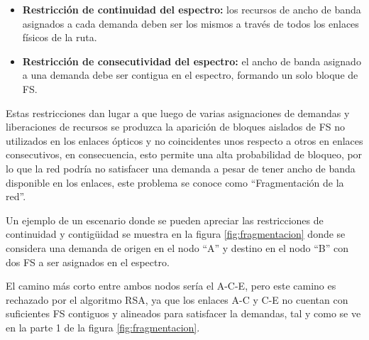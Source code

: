 \begin{itemize}
    \item \textbf{Restricción de continuidad del espectro:} los recursos de ancho de banda asignados a cada demanda deben ser los mismos a través de todos los enlaces físicos de la ruta.
    \item \textbf{Restricción de consecutividad del espectro:} el ancho de banda asignado a una demanda debe ser contigua en el espectro, formando un solo bloque de FS. 
\end{itemize}

Estas restricciones dan lugar a que luego de varias asignaciones de demandas y liberaciones de recursos se produzca la aparición de bloques aislados de FS no utilizados en los enlaces ópticos y no coincidentes unos respecto a otros en enlaces consecutivos, en consecuencia, esto permite una alta probabilidad de bloqueo, por lo que la red podría no satisfacer una demanda a pesar de tener ancho de banda disponible en los enlaces, este problema se conoce como “Fragmentación de la red”.


Un ejemplo de un escenario donde se pueden apreciar las restricciones de continuidad y contigüidad se muestra en la figura \ref{fig:fragmentacion} donde se considera una demanda de origen en el nodo ``A'' y destino en el nodo ``B'' con dos FS a ser asignados en el espectro.

El camino más corto entre ambos nodos sería el A-C-E, pero este camino es rechazado por el algoritmo RSA, ya que los enlaces A-C y C-E no cuentan con suficientes FS contiguos y alineados para satisfacer la demandas, tal y como se ve en la parte 1 de la figura \ref{fig:fragmentacion}.

